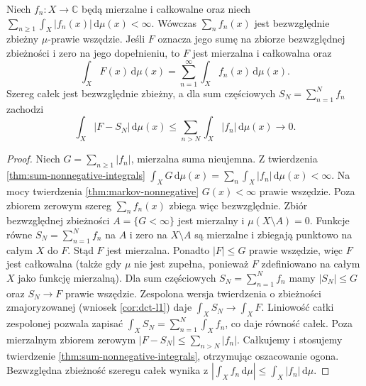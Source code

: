 \begin{twierdzenie}
\label{thm:sum-absolutely-integrable}
Niech $f_n:X\to\mathbb C$ będą mierzalne i
całkowalne oraz niech
$\sum_{n\ge1}\int_X|f_n(x)|\,\mathrm d\mu(x)<\infty$.
Wówczas $\sum_nf_n(x)$ jest bezwzględnie zbieżny
$\mu$-prawie wszędzie. Jeśli $F$ oznacza jego sumę
na zbiorze bezwzględnej zbieżności i zero na jego dopełnieniu,
to $F$ jest mierzalna i całkowalna oraz
\begin{equation}\label{eq:interchange-series}
\int_XF(x)\,\mathrm d\mu(x)
=\sum_{n=1}^{\infty}\int_Xf_n(x)\,\mathrm d\mu(x).
\end{equation}
Szereg całek jest bezwzględnie zbieżny, a dla sum
częściowych $S_N=\sum_{n=1}^N f_n$ zachodzi
\[
 \int_X|F-S_N|\,\mathrm d\mu(x)
 \le\sum_{n>N}\int_X|f_n|\,\mathrm d\mu(x)
 \longrightarrow0.
\]
\end{twierdzenie}
\begin{proof}
Niech $G=\sum_{n\ge1}|f_n|$, mierzalna suma
nieujemna. Z twierdzenia
\ref{thm:sum-nonnegative-integrals}
$\int_XG\,\mathrm d\mu(x)=
\sum_n\int_X|f_n|\,\mathrm d\mu(x)<\infty$.
Na mocy twierdzenia \ref{thm:markov-nonnegative}
$G(x)<\infty$ prawie wszędzie. Poza zbiorem
zerowym szereg $\sum_nf_n(x)$ zbiega więc
bezwzględnie. Zbiór bezwzględnej zbieżności $A=\{G<\infty\}$
jest mierzalny i $\mu(X\setminus A)=0$.
Funkcje równe $S_N=\sum_{n=1}^N f_n$ na $A$ i zero na $X\setminus A$
są mierzalne i zbiegają punktowo na całym $X$ do $F$.
Stąd $F$ jest mierzalna. Ponadto $|F|\le G$ prawie wszędzie,
więc $F$ jest całkowalna (także gdy $\mu$ nie jest zupełna,
ponieważ $F$ zdefiniowano na całym $X$ jako funkcję mierzalną).
Dla sum częściowych $S_N=\sum_{n=1}^Nf_n$
mamy $|S_N|\le G$ oraz $S_N\to F$ prawie wszędzie.
Zespolona wersja twierdzenia o zbieżności zmajoryzowanej
(wniosek \ref{cor:dct-l1}) daje $\int_XS_N\to\int_XF$. Liniowość całki
zespolonej pozwala zapisać
$\int_XS_N=\sum_{n=1}^N\int_Xf_n$, co daje równość całek.
Poza mierzalnym zbiorem zerowym
$|F-S_N|\le\sum_{n>N}|f_n|$.
Całkujemy i stosujemy twierdzenie
\ref{thm:sum-nonnegative-integrals}, otrzymując
oszacowanie ogona. Bezwzględna zbieżność szeregu całek
wynika z $|\int_Xf_n\,\mathrm d\mu|\le\int_X|f_n|\,\mathrm d\mu$.
\end{proof}

